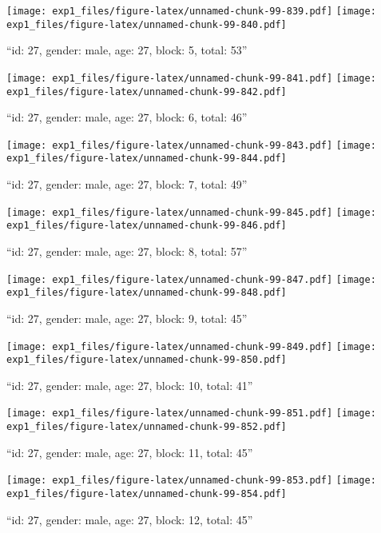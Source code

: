 \documentclass[,]{article}
\begin{document}
\texttt{[image: exp1\_files/figure-latex/unnamed-chunk-99-839.pdf]}
\texttt{[image: exp1\_files/figure-latex/unnamed-chunk-99-840.pdf]}

\newpage
[1] 

``id: 27, gender: male, age: 27, block: 5, total: 53''

\texttt{[image: exp1\_files/figure-latex/unnamed-chunk-99-841.pdf]}
\texttt{[image: exp1\_files/figure-latex/unnamed-chunk-99-842.pdf]}

\newpage
[1] 

``id: 27, gender: male, age: 27, block: 6, total: 46''

\texttt{[image: exp1\_files/figure-latex/unnamed-chunk-99-843.pdf]}
\texttt{[image: exp1\_files/figure-latex/unnamed-chunk-99-844.pdf]}

\newpage
[1] 

``id: 27, gender: male, age: 27, block: 7, total: 49''

\texttt{[image: exp1\_files/figure-latex/unnamed-chunk-99-845.pdf]}
\texttt{[image: exp1\_files/figure-latex/unnamed-chunk-99-846.pdf]}

\newpage
[1] 

``id: 27, gender: male, age: 27, block: 8, total: 57''

\texttt{[image: exp1\_files/figure-latex/unnamed-chunk-99-847.pdf]}
\texttt{[image: exp1\_files/figure-latex/unnamed-chunk-99-848.pdf]}

\newpage
[1] 

``id: 27, gender: male, age: 27, block: 9, total: 45''

\texttt{[image: exp1\_files/figure-latex/unnamed-chunk-99-849.pdf]}
\texttt{[image: exp1\_files/figure-latex/unnamed-chunk-99-850.pdf]}

\newpage
[1] 

``id: 27, gender: male, age: 27, block: 10, total: 41''

\texttt{[image: exp1\_files/figure-latex/unnamed-chunk-99-851.pdf]}
\texttt{[image: exp1\_files/figure-latex/unnamed-chunk-99-852.pdf]}

\newpage
[1] 

``id: 27, gender: male, age: 27, block: 11, total: 45''

\texttt{[image: exp1\_files/figure-latex/unnamed-chunk-99-853.pdf]}
\texttt{[image: exp1\_files/figure-latex/unnamed-chunk-99-854.pdf]}

\newpage
[1] 

``id: 27, gender: male, age: 27, block: 12, total: 45''
\end{document}
